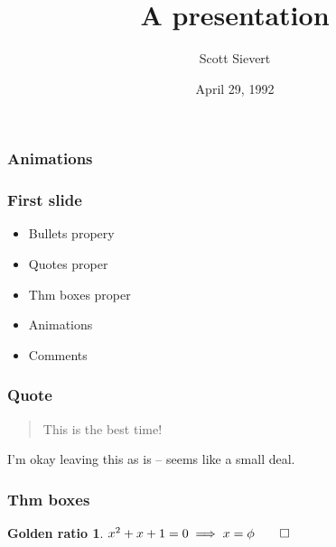 \documentclass{beamer}
\title[An alternate title]{A presentation}
\author{Scott Sievert}
\institute{University of Wisconsin-Madison}
\date{April 29, 1992}
\newtheorem{mydef}{Golden ratio}
\begin{document}
\maketitle

\begin{frame}
    \frametitle{Animations}
\end{frame}

\begin{frame}
    \frametitle{First slide}
    \begin{itemize}
        \item Bullets propery
        \item Quotes proper
        \item Thm boxes proper
        \item Animations
        \item Comments
    \end{itemize}
\end{frame}

\begin{frame}
    \frametitle{Quote}
    \begin{quotation}
        This is the best time!
    \end{quotation}
    I'm okay leaving this as is -- seems like a small deal.
\end{frame}

\begin{frame}
    \frametitle{Thm boxes}
    \begin{mydef}
        $x^2 + x + 1 = 0 \implies x = \phi \qed$
    \end{mydef}
\end{frame}
\end{document}
